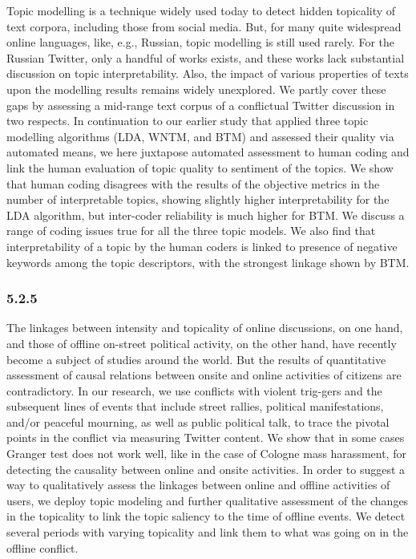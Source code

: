 Topic modelling is a technique widely used today to detect hidden topicality of text corpora, including those from social media. But, for many quite widespread online languages, like, e.g., Russian, topic modelling is still used rarely. For the Russian Twitter, only a handful of works exists, and these works lack substantial discussion on topic interpretability. Also, the impact of various properties of texts upon the modelling results remains widely unexplored. We partly cover these gaps by assessing a mid-range text corpus of a conflictual Twitter discussion in two respects. In continuation to our earlier study that applied three topic modelling algorithms (LDA, WNTM, and BTM) and assessed their quality via automated means, we here juxtapose automated assessment to human coding and link the human evaluation of topic quality to sentiment of the topics. We show that human coding disagrees with the results of the objective metrics in the number of interpretable topics, showing slightly higher interpretability for the LDA algorithm, but inter-coder reliability is much higher for BTM. We discuss a range of coding issues true for all the three topic models. We also find that interpretability of a topic by the human coders is linked to presence of negative keywords among the topic descriptors, with the strongest linkage shown by BTM.

\subsubsection{5.2.5}

The linkages between intensity and topicality of online discussions, on one hand, and those of offline on-street political activity, on the other hand, have recently become a subject of studies around the world. But the results of quantitative assessment of causal relations between onsite and online activities of citizens are contradictory. In our research, we use conflicts with violent trig-gers and the subsequent lines of events that include street rallies, political manifestations, and/or peaceful mourning, as well as public political talk, to trace the pivotal points in the conflict via measuring Twitter content. We show that in some cases Granger test does not work well, like in the case of Cologne mass harassment, for detecting the causality between online and onsite activities. In order to suggest a way to qualitatively assess the linkages between online and offline activities of users, we deploy topic modeling and further qualitative assessment of the changes in the topicality to link the topic saliency to the time of offline events. We detect several periods with varying topicality and link them to what was going on in the offline conflict.


